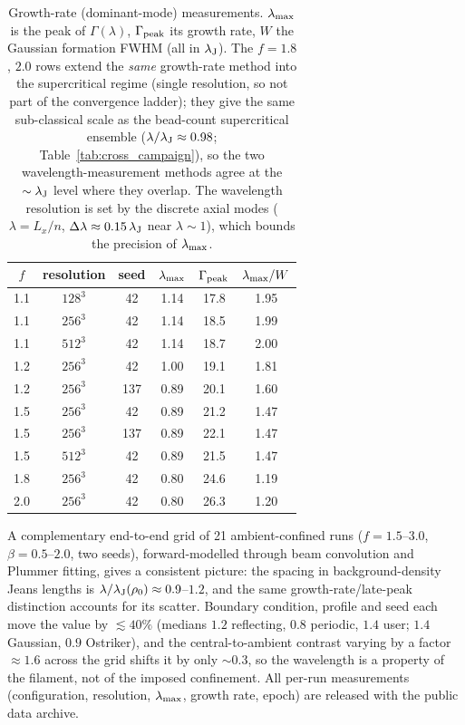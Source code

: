 \documentclass[usenatbib,twoside,twocolumn]{mnras}
\begin{document}
\begin{table}
\caption{Growth-rate (dominant-mode) measurements. $\lambda_{\rm max}$ is the peak of $\Gamma(\lambda)$, $\Gamma_{\rm peak}$ its growth rate, $W$ the Gaussian formation FWHM (all in $\lambda_{\rm J}$). The $f=1.8$, $2.0$ rows extend the \emph{same} growth-rate method into the supercritical regime (single resolution, so not part of the convergence ladder); they give the same sub-classical scale as the bead-count supercritical ensemble ($\lambda/\lambda_{\rm J}\approx0.98$; Table~\ref{tab:cross_campaign}), so the two wavelength-measurement methods agree at the $\sim\lambda_{\rm J}$ level where they overlap. The wavelength resolution is set by the discrete axial modes ($\lambda=L_x/n$, $\Delta\lambda\approx0.15\,\lambda_{\rm J}$ near $\lambda\sim1$), which bounds the precision of $\lambda_{\rm max}$.}
\label{tab:wave}
\footnotesize
\setlength{\tabcolsep}{4pt}
\begin{tabular}{cccccc}
\toprule
$f$ & resolution & seed & $\lambda_{\rm max}$ & $\Gamma_{\rm peak}$ & $\lambda_{\rm max}/W$ \\
\midrule
1.1 & $128^3$ & 42  & 1.14 & 17.8 & 1.95 \\
1.1 & $256^3$ & 42  & 1.14 & 18.5 & 1.99 \\
1.1 & $512^3$ & 42  & 1.14 & 18.7 & 2.00 \\
1.2 & $256^3$ & 42  & 1.00 & 19.1 & 1.81 \\
1.2 & $256^3$ & 137 & 0.89 & 20.1 & 1.60 \\
1.5 & $256^3$ & 42  & 0.89 & 21.2 & 1.47 \\
1.5 & $256^3$ & 137 & 0.89 & 22.1 & 1.47 \\
1.5 & $512^3$ & 42  & 0.89 & 21.5 & 1.47 \\
1.8 & $256^3$ & 42  & 0.80 & 24.6 & 1.19 \\
2.0 & $256^3$ & 42  & 0.80 & 26.3 & 1.20 \\
\bottomrule
\end{tabular}
\end{table}

A complementary end-to-end grid of 21 ambient-confined runs ($f=1.5$--$3.0$, $\beta=0.5$--$2.0$, two seeds), forward-modelled through beam convolution and Plummer fitting, gives a consistent picture: the spacing in background-density Jeans lengths is $\lambda/\lambda_{\rm J}(\rho_0)\approx0.9$--$1.2$, and the same growth-rate/late-peak distinction accounts for its scatter. Boundary condition, profile and seed each move the value by $\lesssim40\%$ (medians $1.2$ reflecting, $0.8$ periodic, $1.4$ user; $1.4$ Gaussian, $0.9$ Ostriker), and the central-to-ambient contrast varying by a factor $\approx1.6$ across the grid shifts it by only $\sim0.3$, so the wavelength is a property of the filament, not of the imposed confinement. All per-run measurements (configuration, resolution, $\lambda_{\rm max}$, growth rate, epoch) are released with the public data archive.
\end{document}
